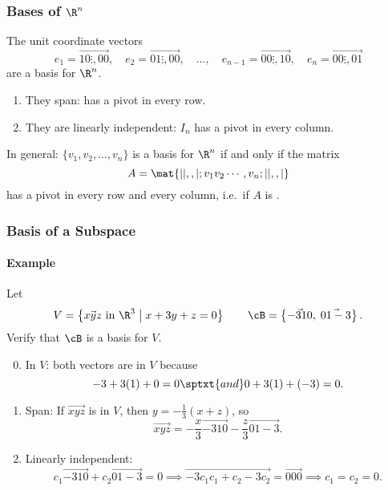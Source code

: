 
\begin{frame}
\frametitle{Bases of $\R^n$}

The unit coordinate vectors
\[ e_1 = \vec{1 0 \vdots, 0 0},\quad e_2 = \vec{0 1 \vdots, 0 0},\quad\ldots,\quad
   e_{n-1} = \vec{0 0 \vdots, 1 0},\quad e_n = \vec{0 0 \vdots, 0 1} \]
are a basis for $\R^n$.
\pause
\begin{enumerate}
\item They span:  has a pivot in every row.
\pause
{}
\pause
\item They are linearly independent: $I_n$ has a pivot in every column.
\end{enumerate}

\pause\medskip
\alert{In general:} $\{v_1,v_2,\ldots,v_n\}$ is a basis for $\R^n$ if and only
if the matrix 
\[ A = \mat{| | ,, |; v_1 v_2 \cdots, v_n; | | ,, |} \]
has a pivot in every row and every column,
i.e.\ if $A$ is .

\end{frame}



\begin{frame}
\frametitle{Basis of a Subspace}
\framesubtitle{Example}

\vskip-3mm
\begin{eg}
  Let
  \[ V = \left\{ \vec{x y z} \text{ in } \R^3\bigm| x + 3y + z = 0 \right\} \qquad 
  \cB = \left\{ \vec{-3 1 0},\;\vec{0 1 -3} \right\}. \]
  Verify that $\cB$ is a basis for $V$.

  \begin{webonly}
    \displayskips{3pt}
  \begin{enumerate}\setcounter{enumi}{-1}
  \item \alert{In $V$:} both vectors are in $V$ because
    \[ -3 + 3(1) + 0 = 0 \sptxt{and} 0 + 3(1) + (-3) = 0. \]
    
  \item \alert{Span:}
    If $\vec{x y z}$ is in $V$, then $y = -\frac 13(x+z)$, so
    \vskip-3mm
    \[ \vec{x y z} = -\frac x3\vec{-3 1 0} - \frac z3\vec{0 1 -3}. \]
    
  \item \alert{Linearly independent:}
    \[ c_1\vec{-3 1 0} + c_2\vec{0 1 -3} = 0
    \implies \vec{-3c_1 c_1+c_2 -3c_2} = \vec{0 0 0}
    \implies c_1 = c_2 = 0. \]
  \end{enumerate}
  \end{webonly}
\end{eg}

\end{frame}


